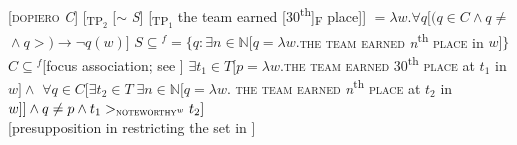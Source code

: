 \documentclass[output=paper,colorlinks,citecolor=brown]{langscibook}
\begin{document}

\ea\label{ex:tom:88}
\ea\label{ex:tom:88a} 
{}[\textsc{dopiero} \textit{C}] [\textsubscript{TP$_2$} [$\sim$ \textit{S}] [\textsubscript{TP$_1$} the team earned [30\textsuperscript{th}]\textsubscript{F} place]]
\ex\label{ex:tom:88b}     
${} = λw.\forall q [(q\in C\wedge q\neq{}$${}\wedge q >{}$$) → ¬q(w)]$
\ex\label{ex:tom:88c}      
$S\subseteq{}$$^f = \{q:\exists n\in ℕ [q = λw.{}$\textsc{the team earned} \textit{n}\textsuperscript{th} \textsc{place} in $w]\}$
\ex\label{ex:tom:88d} 
$C\subseteq{}$$^f$\hfill [focus association; see ]
\ex\label{ex:tom:88e}
$\exists t_1\in T [p = λw.{}$\textsc{the team earned} 30\textsuperscript{th} 
\textsc{place} at $t_1$ in $w]\wedge{}$ $\forall q\in C [\exists t_2\in T\;\exists n\in ℕ [q = λw.{}$ \textsc{the team earned} \textit{n}\textsuperscript{th} \textsc{place} at $t_2$ in $w]]\wedge q\neq p\wedge t_1>_{\textsc{noteworthy}^w}t_2]$\\\hfill [presupposition in  restricting the set in ]
\z \z 
\end{document}
